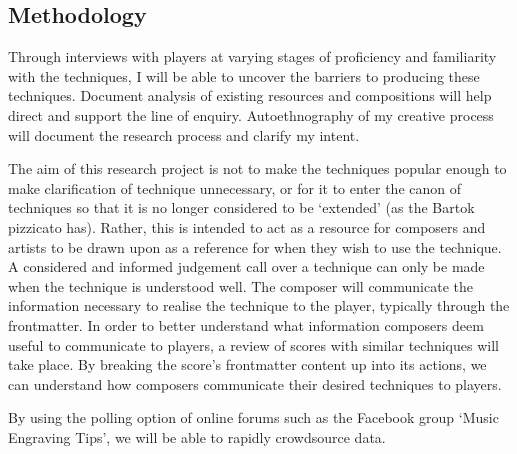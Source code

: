 
\subsection{Methodology}
Through interviews with players at varying stages of proficiency and familiarity with the techniques, I will be able to uncover the barriers to producing these techniques. 
Document analysis of existing resources and compositions will help direct and support the line of enquiry. 
Autoethnography of my creative process will document the research process and clarify my intent.  

The aim of this research project is not to make the techniques popular enough to make clarification of technique unnecessary, or for it to enter the canon of techniques so that it is no longer considered to be `extended' (as the Bartok pizzicato has).
Rather, this is intended to act as a resource for composers and artists to be drawn upon as a reference for when they wish to use the technique.
A considered and informed judgement call over a technique can only be made when the technique is understood well.
The composer will communicate the information necessary to realise the technique to the player, typically through the frontmatter. 
In order to better understand what information composers deem useful to communicate to players, a review of scores with similar techniques will take place.
By breaking the score's frontmatter content up into its actions, we can understand how composers communicate their desired techniques to players.

By using the polling option of online forums such as the Facebook group `Music Engraving Tips', we will be able to rapidly crowdsource data.
